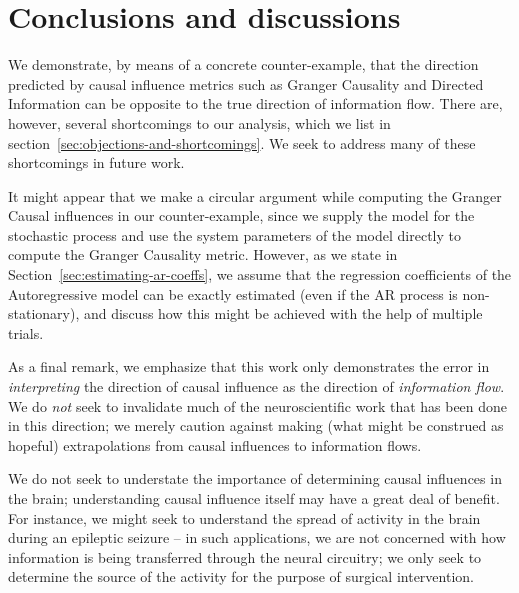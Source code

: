 \documentclass[letterpaper, 10pt, conference]{ieeeconf}
\begin{document}

\section{Conclusions and discussions}
\label{sec:conclusions}

We demonstrate, by means of a concrete counter-example, that the direction predicted by causal influence metrics such as Granger Causality and Directed Information can be opposite to the true direction of information flow. There are, however, several shortcomings to our analysis, which we list in section~\ref{sec:objections-and-shortcomings}. We seek to address many of these shortcomings in future work.

It might appear that we make a circular argument while computing the Granger Causal influences in our counter-example, since we supply the model for the stochastic process and use the system parameters of the model directly to compute the Granger Causality metric. However, as we state in Section~\ref{sec:estimating-ar-coeffs}, we assume that the regression coefficients of the Autoregressive model can be exactly estimated (even if the AR process is non-stationary), and discuss how this might be achieved with the help of multiple trials.

As a final remark, we emphasize that this work only demonstrates the error in \emph{interpreting} the direction of causal influence as the direction of \emph{information flow}. We do \emph{not} seek to invalidate much of the neuroscientific work that has been done in this direction; we merely caution against making (what might be construed as hopeful) extrapolations from causal influences to information flows.

We do not seek to understate the importance of determining causal influences in the brain; understanding causal influence itself may have a great deal of benefit. For instance, we might seek to understand the spread of activity in the brain during an epileptic seizure -- in such applications, we are not concerned with how information is being transferred through the neural circuitry; we only seek to determine the source of the activity for the purpose of surgical intervention.
\end{document}
